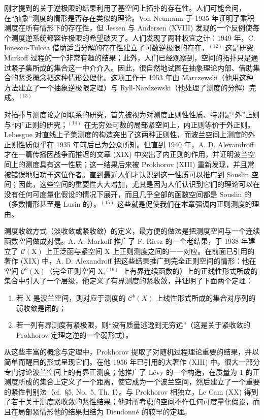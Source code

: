 刚才提到的关于逆极限的结果利用了基空间上拓扑的存在性。人们可能会问，在“抽象”测度的情形是否存在类似的理论。Von Neumann 于 1935 年证明了乘积测度在所有情形下的存在性，但 Jessen 与 Andersen (XVIII) 发现的一个反例使每个测度逆系统都容许极限的希望破灭了。人们发现了两种权宜之计：1949 年，C. Ionescu-Tulcea 借助适当分解的存在性建立了可数逆极限的存在，\(^{(12)}\) 这是研究 Markoff 过程的一个非常有趣的结果；此外，人们已经观察到，空间的拓扑只是通过紧子集所成的集合这一中介介入。因此，很自然地试图在抽象理论内部、借助集合的紧类概念把这种情形公理化。这项工作于 1953 年由 Marczewski（他用这种方法建立了一个抽象逆极限定理）与 Ryll-Nardzewski（他处理了测度的分解）完成。\(^{(13)}\)


对拓扑与测度论之间联系的研究，首先被视为对测度正则性性质、特别是“外”正则与“内”正则的研究；\(^{(14)}\) 在无穷处可数的局部紧空间上，内正则等价于外正则。Lebesgue 对直线上子集测度的构造突出了这两种正则性，而波兰空间上测度的外正则性质似乎在 1935 年前后已为公众所知。但直到 1940 年，A. D. Alexandroff 才在一篇传播因战争而推迟的文章 (XIX) 中突出了内正则的作用，并证明波兰空间上的测度具有这一性质；这一结果后来被 Prokhorov (XIII) 重新发现，并且常被错误地归功于这位作者。直到最近人们才认识到这一性质可以推广到 Souslin 空间；因此，这些空间的重要性大大增加，尤其是因为人们认识到它们的理论可以在没有任何可度量化假设的情况下展开，而且几乎全部的函数空间都是 Souslin 的（多数情形甚至是 Lusin 的）。\(^{(15)}\) 这些就是促使我们在本章强调内正则测度的理由。

测度收敛方式（淡收敛或紧收敛）的定义，最方便的做法是把测度空间与一个连续函数空间做成对偶。A. A. Markoff 推广了 F. Riesz 的一个老结果，于 1938 年建立了 \(\mathcal{C}(\mathrm{X})\) 上正泛函与紧空间 X 上正则测度之间的一一对应。在前面已引用的著作 (XIX) 中，A. D. Alexandroff 把这些结果推广到完全正则空间的情形：他在空间 \(\mathcal{C}^b (\mathrm{X})\)（完全正则空间 \(\mathrm{X},^{(16)}\) 上有界连续函数的）上的正线性形式所成的集合中引入了一个层级，他定义了有界测度的紧收敛，并证明了下面两个定理：

\begin{enumerate}
\def\labelenumi{\alph{enumi})}
\item
  若 X 是波兰空间，则对应于测度的 \(\mathcal{C}^{b}(X)\) 上线性形式所成的集合对序列的弱收敛是闭的；
\item
  若一列有界测度有紧极限，则“没有质量逃逸到无穷远”（这是关于紧收敛的 Prokhorov 定理之逆的一个弱形式）。
\end{enumerate}

从这些丰富的概念与定理中，Prokhorov 提取了对随机过程理论重要的结果，并以简单而醒目的形式呈现它们。在他 1956 年已引用的大著作 (XIII) 中，很大一部分专门讨论波兰空间上的有界正测度；他推广了 Lévy 的一个构造，在质量为 1 的正测度所成的集合上定义了一个距离，使它成为一个波兰空间，然后建立了一个重要的紧性判别法（cf.~§5, No.~5, Th. 1）。与 Prokhorov 相独立，Le Cam (XX) 得到了若干关于测度紧收敛的紧性结果；他对所考虑的空间不作任何可度量化假设，而且在局部紧情形他的结果归结为 Dieudonné 的较早的定理。

